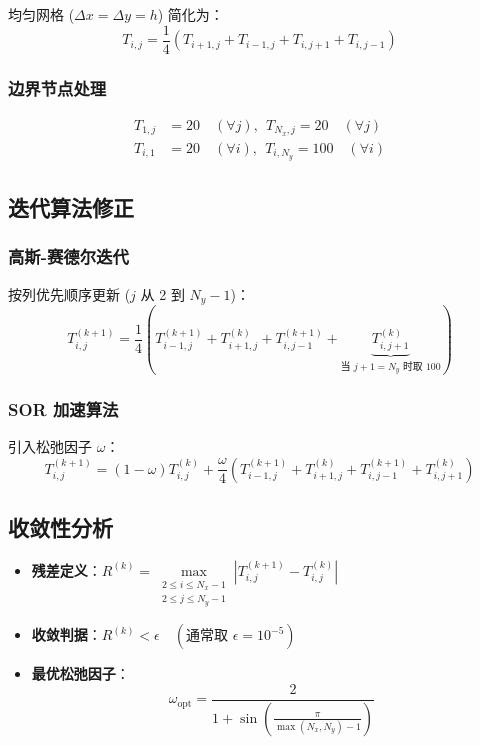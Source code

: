\documentclass[UTF8]{ctexart}
\begin{document}
均匀网格 ($ \Delta x = \Delta y = h $) 简化为：
\begin{equation}
    T_{i,j} = \frac{1}{4}\left( T_{i+1,j} + T_{i-1,j} + T_{i,j+1} + T_{i,j-1} \right)
\end{equation}

\subsubsection{边界节点处理}
\begin{align}
    T_{1,j} &= 20 \quad (\forall j),\ \ T_{N_x,j} = 20 \quad (\forall j) \\
    T_{i,1} &= 20 \quad (\forall i),\ \ T_{i,N_y} = 100 \quad (\forall i)
\end{align}

\subsection{迭代算法修正}
\subsubsection{高斯-赛德尔迭代}
按列优先顺序更新 ($ j $ 从 2 到 $ N_y-1 $)：
\begin{equation}
    T_{i,j}^{(k+1)} = \frac{1}{4}\left( T_{i-1,j}^{(k+1)} + T_{i+1,j}^{(k)} + T_{i,j-1}^{(k+1)} + \underbrace{T_{i,j+1}^{(k)}}_{\text{当 } j+1=N_y \text{ 时取 } 100} \right)
\end{equation}

\subsubsection{SOR 加速算法}
引入松弛因子 $ \omega $：
\begin{equation}
    T_{i,j}^{(k+1)} = (1-\omega)T_{i,j}^{(k)} + \frac{\omega}{4}\left( T_{i-1,j}^{(k+1)} + T_{i+1,j}^{(k)} + T_{i,j-1}^{(k+1)} + T_{i,j+1}^{(k)} \right)
\end{equation}

\subsection{收敛性分析}
\begin{itemize}
    \item \textbf{残差定义}：$ R^{(k)} = \max\limits_{\substack{2 \leq i \leq N_x-1 \\ 2 \leq j \leq N_y-1}} |T_{i,j}^{(k+1)} - T_{i,j}^{(k)}| $
    \item \textbf{收敛判据}：$ R^{(k)} < \epsilon \quad (\text{通常取 } \epsilon = 10^{-5}) $
    \item \textbf{最优松弛因子}：
    \begin{equation}
        \omega_{\text{opt}} = \frac{2}{1 + \sin\left( \frac{\pi}{\max(N_x,N_y)-1} \right)}
    \end{equation}
\end{itemize}
\end{document}
